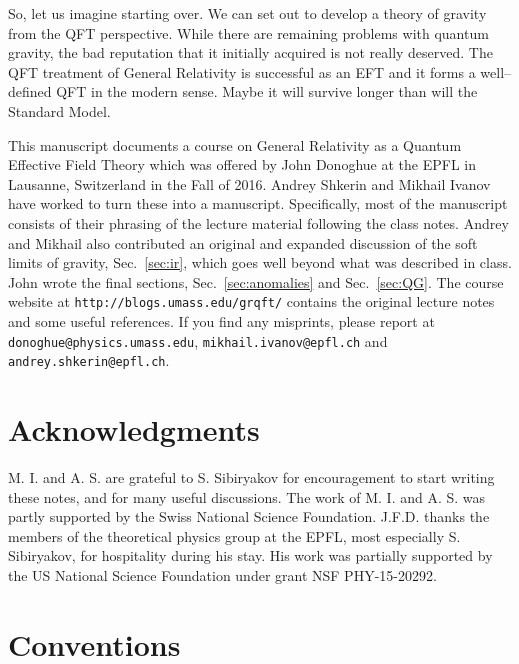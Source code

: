 \documentclass[11pt,a4paper]{article}
\begin{document}
So, let us imagine starting over. We can set out to develop a theory of gravity from the QFT perspective. While there are remaining problems with quantum gravity, the bad reputation that it initially acquired is not really deserved. The QFT treatment of General Relativity is successful as an EFT and it forms a well--defined QFT in the modern sense. Maybe it will survive longer than will the Standard Model.

This manuscript documents a course on General Relativity as a Quantum Effective Field Theory which was offered by John Donoghue at the EPFL in Lausanne, Switzerland in the Fall of 2016.  Andrey Shkerin and Mikhail Ivanov have worked to turn these into a manuscript. Specifically, most of the manuscript consists of their phrasing of the lecture material following the class notes. Andrey and Mikhail also contributed an original and expanded discussion of the soft limits of gravity,
Sec.~\ref{sec:ir}, which goes well beyond what was described in class.
John wrote the final sections, Sec.~\ref{sec:anomalies} and Sec.~\ref{sec:QG}.
The course website at \texttt{http://blogs.umass.edu/grqft/} contains the original lecture notes and some useful references.
If you find any misprints, please report at \texttt{donoghue@physics.umass.edu}, \newline
\texttt{mikhail.ivanov@epfl.ch} and  \texttt{andrey.shkerin@epfl.ch}.


\section*{Acknowledgments}

M. I. and A. S. are grateful to S. Sibiryakov for encouragement to start writing these notes, and for many useful discussions.
The work of M. I. and A. S. was partly supported by the Swiss National Science Foundation. 
J.F.D. thanks the members of the theoretical physics group at the EPFL, most especially S. Sibiryakov, for hospitality during his stay. His work was partially supported by the US National Science Foundation under grant NSF PHY-15-20292.

\section*{Conventions}
\end{document}
